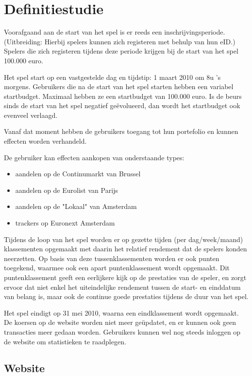 \chapter{Definitiestudie}

Voorafgaand aan de start van het spel is er reeds een inschrijvingsperiode. (Uitbreiding: Hierbij spelers kunnen zich registeren met behulp van hun eID.) Spelers die zich registeren tijdens deze periode krijgen bij de start van het spel 100.000 euro.

Het spel start op een vastgestelde dag en tijdstip: 1 maart 2010 om 8u 's morgens. Gebruikers die na de start van het spel starten hebben een variabel startbudget. Maximaal hebben ze een startbudget van 100.000 euro. Is de beurs sinds de start van het spel negatief geëvolueerd, dan wordt het startbudget ook evenveel verlaagd. 

Vanaf dat moment hebben de gebruikers toegang tot hun portefolio en kunnen effecten worden verhandeld.

De gebruiker kan effecten aankopen van onderstaande types:
\begin{itemize}
  \setlength{\itemsep}{1pt}
  \setlength{\parskip}{0pt}
  \setlength{\parsep}{0pt}
	\item{aandelen op de Continumarkt van Brussel}
	\item{aandelen op de Eurolist van Parijs}
	\item{aandelen op de "Lokaal" van Amsterdam}
	\item{trackers op Euronext Amsterdam}
\end{itemize}

Tijdens de loop van het spel worden er op gezette tijden (per dag/week/maand) klassementen opgemaakt met daarin het relatief rendement dat de spelers konden neerzetten. Op basis van deze tussenklassementen worden er ook punten toegekend, waarmee ook een apart puntenklassement wordt opgemaakt. Dit puntenklassement geeft een eerlijkere kijk op de prestaties van de speler, en zorgt ervoor dat niet enkel het uiteindelijke rendement tussen de start- en einddatum van belang is, maar ook de continue goede prestaties tijdens de duur van het spel.

Het spel eindigt op 31 mei 2010, waarna een eindklassement wordt opgemaakt. De koersen op de website worden niet meer ge\"updatet, en er kunnen ook geen transacties meer gedaan worden. Gebruikers kunnen wel nog steeds inloggen op de website om statistieken te raadplegen.

\section{Website}

